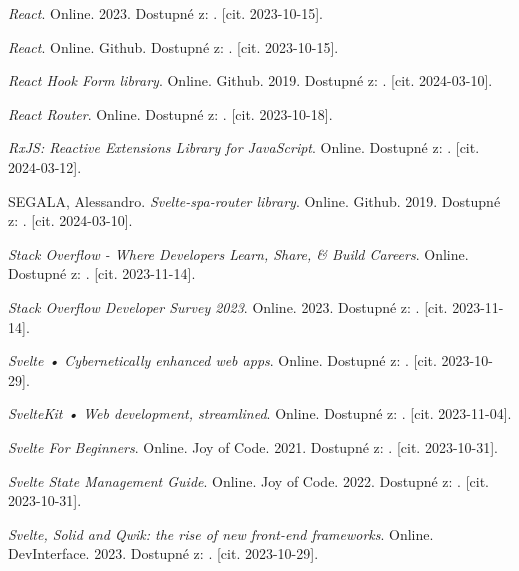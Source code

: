 \begin{thebibliography}{99}
\emph{React}. Online. 2023. Dostupné z: . [cit. 2023-10-15].

\emph{React}. Online. Github. Dostupné z: . [cit. 2023-10-15].

\emph{React Hook Form library}. Online. Github. 2019. Dostupné z: . [cit. 2024-03-10].

\emph{React Router}. Online. Dostupné z: . [cit. 2023-10-18].

\emph{RxJS: Reactive Extensions Library for JavaScript}. Online. Dostupné z: . [cit. 2024-03-12].

\textsc{SEGALA}, Alessandro. \emph{Svelte-spa-router library}. Online. Github. 2019. Dostupné z: . [cit. 2024-03-10].

\emph{Stack Overflow - Where Developers Learn, Share, \& Build Careers}. Online. Dostupné z: . [cit. 2023-11-14].

\emph{Stack Overflow Developer Survey 2023}. Online. 2023. Dostupné z: . [cit. 2023-11-14].

\emph{Svelte • Cybernetically enhanced web apps}. Online. Dostupné z: . [cit. 2023-10-29].

\emph{SvelteKit • Web development, streamlined}. Online. Dostupné z: . [cit. 2023-11-04].

\emph{Svelte For Beginners}. Online. Joy of Code. 2021. Dostupné z: . [cit. 2023-10-31].

\emph{Svelte State Management Guide}. Online. Joy of Code. 2022. Dostupné z: . [cit. 2023-10-31].

\emph{Svelte, Solid and Qwik: the rise of new front-end frameworks}. Online. DevInterface. 2023. Dostupné z: . [cit. 2023-10-29].


\end{thebibliography}
